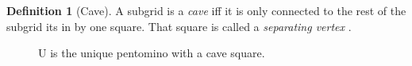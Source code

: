\documentclass{article}
\theoremstyle{definition}%
\newtheorem{definition}[theorem]{Definition}
\newtheorem{example}[theorem]{Example}
\newcommand{\newterm}[1]{\textit{#1}}
\newcommand{\adj}{\operatorname{adj}}
\newcommand{\border}{\operatorname{border}}
\newcommand{\bound}{\operatorname{bound}}
\newcommand{\outside}{\operatorname{outside}}
\begin{document}
%
\begin{definition}[Cave]
A subgrid is a \newterm{cave} iff it is only connected to the rest of the subgrid its in by one square. That square is called a \newterm{separating vertex} \cite{enwiki:separatingvertex}.
\end{definition}
%
%
\begin{figure}
    \centering
    \caption{U is the unique pentomino with a cave square.}
    \label{fig:ucave}
\end{figure}
%
\end{document}
